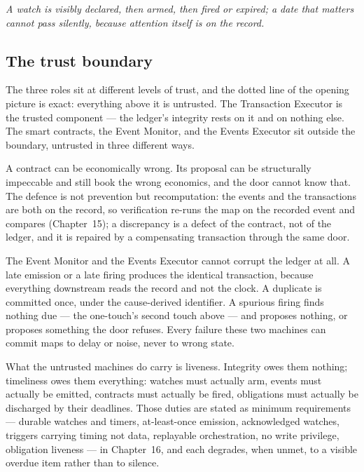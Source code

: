 \emph{A watch is visibly declared, then armed, then fired or expired; a date
that matters cannot pass silently, because attention itself is on the record.}

\subsection{The trust boundary}

The three roles sit at different levels of trust, and the dotted line of the
opening picture is exact: everything above it is untrusted. The Transaction
Executor is the trusted component --- the ledger's integrity rests on it and on
nothing else. The smart contracts, the Event Monitor, and the Events Executor
sit outside the boundary, untrusted in three different ways.

A contract can be economically wrong. Its proposal can be structurally
impeccable and still book the wrong economics, and the door cannot know that.
The defence is not prevention but recomputation: the events and the
transactions are both on the record, so verification re-runs the map on the
recorded event and compares (Chapter~15); a discrepancy is a defect of the
contract, not of the ledger, and it is repaired by a compensating transaction
through the same door.

The Event Monitor and the Events Executor cannot corrupt the ledger at all. A
late emission or a late firing produces the identical transaction, because
everything downstream reads the record and not the clock. A duplicate is
committed once, under the cause-derived identifier. A spurious firing finds
nothing due --- the one-touch's second touch above --- and proposes nothing, or
proposes something the door refuses. Every failure these two machines can
commit maps to delay or noise, never to wrong state.

What the untrusted machines do carry is liveness. Integrity owes them nothing;
timeliness owes them everything: watches must actually arm, events must
actually be emitted, contracts must actually be fired, obligations must
actually be discharged by their deadlines. Those duties are stated as minimum
requirements --- durable watches and timers, at-least-once emission,
acknowledged watches, triggers carrying timing not data, replayable
orchestration, no write privilege, obligation liveness --- in Chapter~16, and
each degrades, when unmet, to a visible overdue item rather than to silence.
